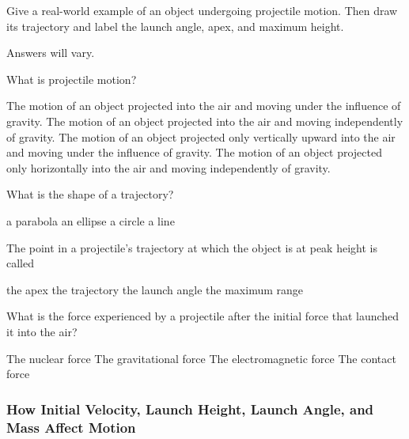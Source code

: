 \documentclass[../main-physics-workbook.tex]{subfiles}
\begin{document}
\begin{questions}
\question
Give a real-world example of an object undergoing projectile motion. Then draw its trajectory and label the launch angle, apex, and maximum height.

\begin{solutionorbox}[5cm]
    Answers will vary.
\end{solutionorbox}

\question
What is projectile motion?
    
\begin{randomizechoices}
    \correctchoice The motion of an object projected into the air and moving under the influence of gravity.
    \choice The motion of an object projected into the air and moving independently of gravity.
    \choice The motion of an object projected only vertically upward into the air and moving under the influence of gravity.
    \choice The motion of an object projected only horizontally into the air and moving independently of gravity.
\end{randomizechoices}

\question
What is the shape of a trajectory?

\begin{randomizechoices}
    \correctchoice a parabola
    \choice an ellipse
    \choice a circle
    \choice a line
\end{randomizechoices}

\question
The point in a projectile's trajectory at which the object is at peak height is called

\begin{randomizechoices}
    \correctchoice the apex
    \choice the trajectory
    \choice the launch angle
    \choice the maximum range
\end{randomizechoices}

\question
What is the force experienced by a projectile after the initial force that launched it into the air?

\begin{randomizechoices}
    \choice The nuclear force
    \correctchoice The gravitational force
    \choice The electromagnetic force
    \choice The contact force
\end{randomizechoices}
\end{questions}


\subsubsection{How Initial Velocity, Launch Height, Launch Angle, and Mass Affect Motion}
\end{document}
